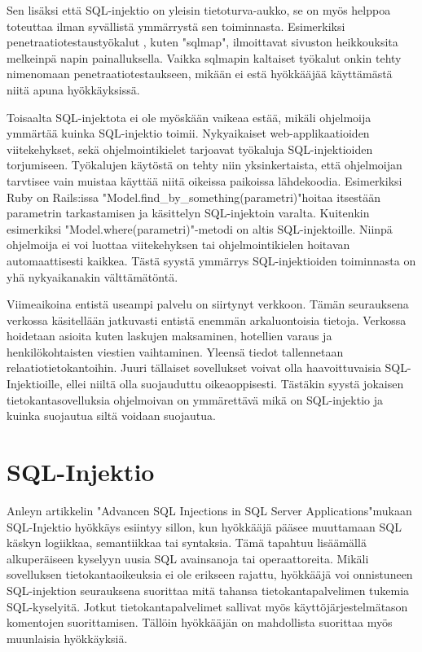 \documentclass[finnish]{tktltiki2}
\theoremstyle{definition}
\theoremstyle{remark}
\begin{document}
	Sen lisäksi että SQL-injektio on yleisin tietoturva-aukko, se on myös helppoa toteuttaa ilman syvällistä ymmärrystä sen toiminnasta. Esimerkiksi penetraatiotestaustyökalut , kuten "sqlmap"\space, ilmoittavat sivuston heikkouksita melkeinpä napin painalluksella. Vaikka sqlmapin kaltaiset työkalut onkin tehty nimenomaan penetraatiotestaukseen, mikään ei estä hyökkääjää käyttämästä niitä apuna hyökkäyksissä.
	
	Toisaalta SQL-injektota ei ole myöskään vaikeaa estää, mikäli ohjelmoija ymmärtää kuinka SQL-injektio toimii. Nykyaikaiset web-applikaatioiden viitekehykset, sekä ohjelmointikielet tarjoavat työkaluja SQL-injektioiden torjumiseen. Työkalujen käytöstä on tehty niin yksinkertaista, että ohjelmoijan tarvtisee vain muistaa käyttää niitä oikeissa paikoissa lähdekoodia. Esimerkiksi Ruby on Rails:issa  "Model.find\_by\_something(parametri)"\space hoitaa itsestään parametrin tarkastamisen ja käsittelyn SQL-injektoin varalta. Kuitenkin esimerkiksi "Model.where(parametri)"\space -metodi on altis SQL-injektoille. Niinpä ohjelmoija ei voi luottaa viitekehyksen tai ohjelmointikielen hoitavan automaattisesti kaikkea. Tästä syystä ymmärrys SQL-injektioiden toiminnasta on yhä nykyaikanakin välttämätöntä.  
	
	Viimeaikoina entistä useampi palvelu on siirtynyt verkkoon. Tämän seurauksena verkossa käsitellään jatkuvasti entistä enemmän arkaluontoisia tietoja. Verkossa hoidetaan asioita kuten laskujen maksaminen, hotellien varaus ja henkilökohtaisten viestien vaihtaminen. Yleensä tiedot tallennetaan relaatiotietokantoihin. Juuri tällaiset sovellukset voivat olla haavoittuvaisia SQL-Injektioille, ellei niiltä olla suojauduttu oikeaoppisesti. Tästäkin syystä jokaisen tietokantasovelluksia ohjelmoivan on ymmärettävä mikä on SQL-injektio ja kuinka suojautua siltä voidaan suojautua.
	
	
	\section{SQL-Injektio}
	Anleyn artikkelin "Advancen SQL Injections in SQL Server Applications"\cite{definition}\space mukaan SQL-Injektio hyökkäys esiintyy sillon, kun hyökkääjä pääsee muuttamaan SQL käskyn logiikkaa, semantiikkaa tai syntaksia. Tämä tapahtuu lisäämällä alkuperäiseen kyselyyn uusia SQL avainsanoja tai operaattoreita.
	Mikäli sovelluksen tietokantaoikeuksia ei ole erikseen rajattu, hyökkääjä voi onnistuneen SQL-injektion seurauksena suorittaa mitä tahansa tietokantapalvelimen tukemia SQL-kyselyitä. Jotkut tietokantapalvelimet sallivat myös käyttöjärjestelmätason komentojen suorittamisen. Tällöin hyökkääjän on mahdollista suorittaa myös muunlaisia hyökkäyksiä. 
	
\end{document}
